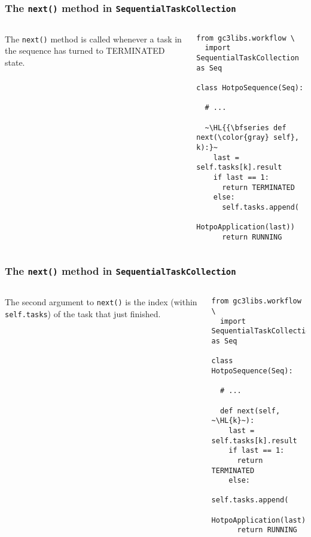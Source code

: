 \documentclass[english,serif,mathserif,xcolor=pdftex,dvipsnames,table]{beamer}
\begin{document}
\begin{frame}[fragile]
  \frametitle{The \texttt{next()} method in \texttt{SequentialTaskCollection}}
  \label{sec:14}

  \begin{columns}
    The \lstinline|next()| method is called whenever a
    task in the sequence has turned to TERMINATED state.


    \begin{lstlisting}[basicstyle=\ttfamily\footnotesize]
from gc3libs.workflow \
  import SequentialTaskCollection as Seq

class HotpoSequence(Seq):

  # ...

  ~\HL{{\bfseries def next(\color{gray} self}, k):}~
    last = self.tasks[k].result
    if last == 1:
      return TERMINATED
    else:
      self.tasks.append(
        HotpoApplication(last))
      return RUNNING
    \end{lstlisting}
  \end{columns}
\end{frame}


\begin{frame}[fragile]
  \frametitle{The \texttt{next()} method in \texttt{SequentialTaskCollection}}
  \label{sec:14}

  \begin{columns}
    The second argument to \lstinline|next()| is the index (within
    \lstinline|self.tasks|) of the task that just finished.


    \begin{lstlisting}[basicstyle=\ttfamily\footnotesize]
from gc3libs.workflow \
  import SequentialTaskCollection as Seq

class HotpoSequence(Seq):

  # ...

  def next(self, ~\HL{k}~):
    last = self.tasks[k].result
    if last == 1:
      return TERMINATED
    else:
      self.tasks.append(
        HotpoApplication(last))
      return RUNNING
    \end{lstlisting}
  \end{columns}
\end{frame}
\end{document}
